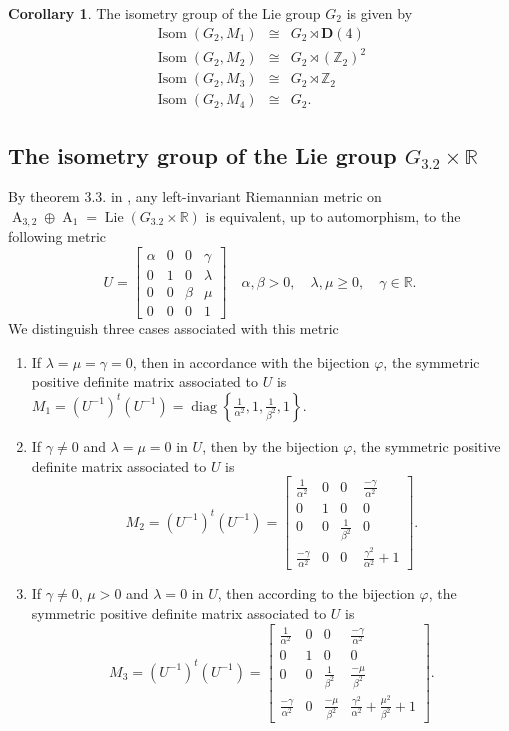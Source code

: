 \documentclass[12pt,a4paper,twoside]{article}
\theoremstyle{definition}
\newtheorem{corollary}[theorem]{Corollary}
\begin{document}
\begin{corollary}
The isometry group of the Lie group $G_2$ is given by
\begin{eqnarray*}
\operatorname{Isom}\left(G_2, M_1\right)  &\cong& G_2 \rtimes \mathbf{D}(4)\\
\operatorname{Isom}\left(G_2, M_2\right)  &\cong& G_2 \rtimes \left(\mathbb{Z}_2\right)^2\\
\operatorname{Isom}\left(G_2, M_3\right)  &\cong& G_2 \rtimes \mathbb{Z}_2\\
\operatorname{Isom}\left(G_2, M_4\right)  &\cong& G_2.
\end{eqnarray*}
\end{corollary}
\subsection{The isometry group of the Lie group $G_{3.2} \times \mathbb{R}$}
By theorem 3.3. in \cite{aitbenhaddou2025classification}, any left-invariant Riemannian metric on $\operatorname{A}_{3, 2} \oplus \operatorname{A}_1 = \operatorname{Lie}(G_{3.2} \times \mathbb{R})$ is equivalent, up to automorphism, to the following metric
$$U = \begin{bmatrix}
\alpha & 0 & 0 & \gamma\\
0 & 1 & 0 & \lambda\\
0 & 0 & \beta & \mu\\
0 & 0 & 0 & 1
\end{bmatrix} \quad \alpha, \beta > 0, \quad \lambda, \mu \geq 0, \quad \gamma \in \mathbb{R}.$$
We distinguish three cases associated with this metric
\begin{enumerate}
\item If $\lambda = \mu = \gamma = 0$, then in accordance with the bijection $\varphi$, the symmetric positive definite matrix associated to $U$ is $M_1 = (U^{-1})^t(U^{-1}) = \operatorname{diag}\left\lbrace \frac{1}{\alpha^2}, 1, \frac{1}{\beta^2}, 1\right\rbrace$.
\item If $\gamma \neq 0$ and $\lambda = \mu = 0$ in $U$, then by the bijection $\varphi$, the symmetric positive definite matrix associated to $U$ is
$$M_2 = (U^{-1})^t(U^{-1}) = \begin{bmatrix}
\frac{1}{\alpha^2} & 0 & 0 & \frac{-\gamma}{\alpha^2}\\
0 & 1 & 0 & 0\\
0 & 0 & \frac{1}{\beta^2} & 0\\
\frac{-\gamma}{\alpha^2} & 0 & 0 & \frac{\gamma^2}{\alpha^2} + 1
\end{bmatrix}.$$
\item If $\gamma \neq 0$, $\mu > 0$ and $\lambda = 0$ in $U$, then according to the bijection $\varphi$, the symmetric positive definite matrix associated to $U$ is 
$$M_3 = (U^{-1})^t(U^{-1}) = \begin{bmatrix}
\frac{1}{\alpha^2} & 0 & 0 & \frac{-\gamma}{\alpha^2}\\
0 & 1 & 0 & 0\\
0 & 0 & \frac{1}{\beta^2} & \frac{-\mu}{\beta^2}\\
\frac{-\gamma}{\alpha^2} & 0 & \frac{-\mu}{\beta^2} & \frac{\gamma^2}{\alpha^2} + \frac{\mu^2}{\beta^2} + 1
\end{bmatrix}.$$
\end{enumerate}
\end{document}
